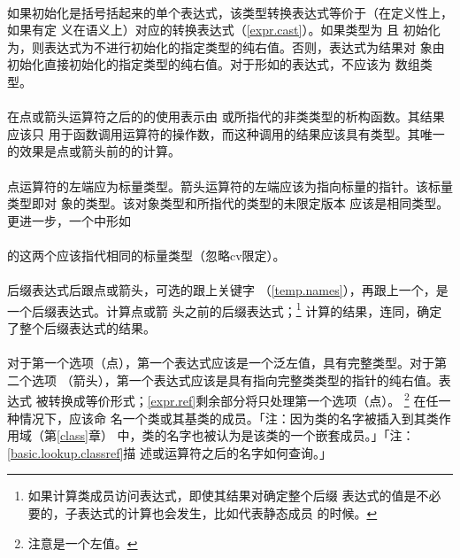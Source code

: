 \paragraph{}
如果初始化是括号括起来的单个表达式，该类型转换表达式等价于（在定义性上，如果有定
义在语义上）对应的转换表达式（\ref{expr.cast}）。如果类型为  且
初始化为\tm{()}，则表达式为不进行初始化的指定类型的纯右值。否则，表达式为结果对
象由初始化直接初始化的指定类型的纯右值。对于形如的表达式，不应该为
数组类型。

\paragraph{}
在点或箭头\tm{-\tg}运算符之后的的使用表示由
或所指代的非类类型的析构函数。其结果应该只
用于函数调用运算符\tm{()}的操作数，而这种调用的结果应该具有类型。其唯一
的效果是点或箭头前的的计算。

\paragraph{}
点运算符的左端应为标量类型。箭头运算符的左端应该为指向标量的指针。该标量类型即对
象的类型。该对象类型和所指代的类型的未限定版本
应该是相同类型。更进一步，一个中形如               \\
\mbox{\qquad {} \tm{::\~}
  }                                                             \\
的这两个应该指代相同的标量类型（忽略cv限定）。

\paragraph{}
后缀表达式后跟点或箭头\tm{-\tg}，可选的跟上关键字
（\ref{temp.names}），再跟上一个，是一个后缀表达式。计算点或箭
头之前的后缀表达式；\footnote{如果计算类成员访问表达式，即使其结果对确定整个后缀
表达式的值是不必要的，子表达式的计算也会发生，比如代表静态成员
的时候。} 计算的结果，连同，确定了整个后缀表达式的结果。

\paragraph{}
对于第一个选项（点），第一个表达式应该是一个泛左值，具有完整类型。对于第二个选项
（箭头），第一个表达式应该是具有指向完整类类型的指针的纯右值。表达式
被转换成等价形式；\ref{expr.ref}剩余部分将只处理第一个选项（点）。
\footnote{注意是一个左值。} 在任一种情况下，应该命
名一个类或其基类的成员。「注：因为类的名字被插入到其类作用域（第\ref{class}章）
中，类的名字也被认为是该类的一个嵌套成员。」「注：\ref{basic.lookup.classref}描
述或\tm{->}运算符之后的名字如何查询。」

